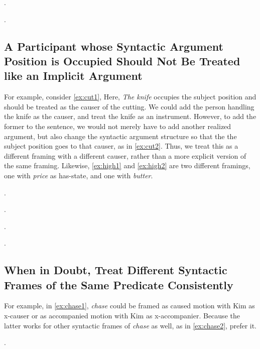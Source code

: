 \documentclass[a4paper]{article}
\newcommand{\rl}[1]{\textsf{#1}}
\begin{document}
\ex.

\ex.


\newpage\subsection{A Participant whose Syntactic Argument Position is Occupied Should Not Be Treated like an Implicit Argument}

For example, consider \ref{ex:cut1}, Here, \emph{The knife} occupies the subject position and should be treated as the causer of the cutting. We could add the person handling the knife as the causer, and treat the knife as an instrument. However, to add the former to the sentence, we would not merely have to add another realized argument, but also change the syntactic argument structure so that the the subject position goes to that causer, as in \ref{ex:cut2}. Thus, we treat this as a different framing with a different causer, rather than a more explicit version of the same framing. Likewise, \ref{ex:high1} and \ref{ex:high2} are two different framings, one with \emph{price} as \rl{has-state}, and one with \emph{butter}.

\ex.\label{ex:cut1}

\ex.\label{ex:cut2}

\ex.\label{ex:high1}

\ex.\label{ex:high2}


\newpage\subsection{When in Doubt, Treat Different Syntactic Frames of the Same Predicate Consistently}

For example, in \ref{ex:chase1}, \emph{chase} could be framed as caused motion
with Kim as \rl{x-causer} or as accompanied motion with Kim as
\rl{x-accompanier}. Because the latter works for other syntactic frames of
\emph{chase} as well, as in \ref{ex:chase2}, prefer it.

\ex.\label{ex:chase1}
\end{document}
